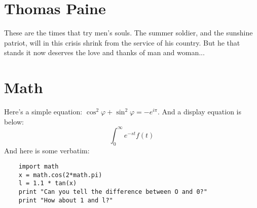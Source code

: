 \documentclass[12pt]{article}
\newcommand{\laplace}{$$\int_0^\infty e^{-st}f(t)$$}
\begin{document}
\section{Thomas Paine}
    
    These are the times that try men's souls. The summer soldier, and the sunshine patriot, will in this crisis shrink from the service of his country. But he that stands it now deserves the love and thanks of man and woman...

\section{Math}

Here's a simple equation: $\cos^2 \varphi + \sin^2 \varphi = -e^{i\pi}$. And a display equation is below:
    \laplace
And here is some verbatim:
\begin{verbatim}
    import math
    x = math.cos(2*math.pi)
    l = 1.1 * tan(x)
    print "Can you tell the difference between O and 0?"
    print "How about 1 and l?"
\end{verbatim}  


    
\end{document}
